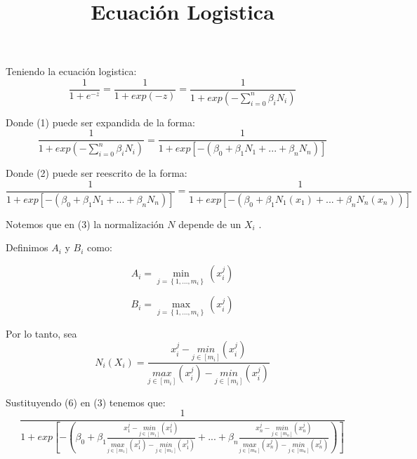 \documentclass{article}
\begin{document}
\title{Ecuación Logistica}
\maketitle
Teniendo la ecuación logistica:
\begin{equation}
    \label{simple_equation}
    \frac{1}{1+e^{-z}} = \frac{1}{1+exp\left ( -z\right )} = \frac{1}{1+exp\left (-\sum_{i=0}^{n} \beta _{i}N_{i} \right )}
\end{equation}

Donde (1) puede ser expandida de la forma:
\begin{equation}
    \label{simple_equation}
    \frac{1}{1+exp\left (-\sum_{i=0}^{n} \beta _{i}N_{i} \right )} = \frac{1}{1+exp\left [ -\left ( \beta _{0} + \beta _{1}N_{1}+...+\beta_{n}N_{n} \right ) \right ]}
\end{equation}

Donde (2) puede ser reescrito de la forma:
\begin{equation}
    \label{simple_equiation}    
    \frac{1}{1+exp\left [ -\left ( \beta _{0} + \beta _{1}N_{1}+...+\beta_{n}N_{n} \right ) \right ]} = \frac{1}{1+exp\left [ -\left ( \beta _{0} + \beta _{1}N_{1}(x_{1})+...+\beta_{n}N_{n} (x_{n})\right ) \right ]}
\end{equation}

Notemos que en (3) la normalización $N$ depende de un $X_{i}$ .

Definimos $A_{i}$ y $B_{i}$ como:

\begin{equation}
    \label{simple_equiation}
    A_{i}= \min_{j=\left \{ 1,...,m_{i} \right \}}\left ( x_{i}^{j} \right )
\end{equation}

\begin{equation}
    \label{simple_equiation}
    B_{i}= \max_{j=\left \{ 1,...,m_{i} \right \}}\left ( x_{i}^{j} \right )
\end{equation}

Por lo tanto, sea 
\begin{equation} N_{i} \left ( X_{i} \right )= \frac{x_{i}^{j} - \underset{j\in [m_{i} ]}{min}\left (  x_{i}^{j}\right )}{\underset{j\in [m_{i} ]}{max}\left (  x_{i}^{j}\right )-\underset{j\in [m_{i} ]}{min}\left (  x_{i}^{j}\right )}
\end{equation}

Sustituyendo (6) en (3) tenemos que: 
\begin{equation}
    \frac{1}{1+exp\left [ -\left ( \beta _{0} + \beta _{1}\frac{x_{1}^{j} - \underset{j\in [m_{1} ]}{min}\left (  x_{1}^{j}\right )}{\underset{j\in [m_{1} ]}{max}\left (  x_{1}^{j}\right )-\underset{j\in [m_{1} ]}{min}\left (  x_{1}^{j}\right )}+...+\beta_{n}\frac{x_{n}^{j} - \underset{j\in [m_{n} ]}{min}\left (  x_{n}^{j}\right )}{\underset{j\in [m_{n} ]}{max}\left (  x_{n}^{j}\right )-\underset{j\in [m_{n} ]}{min}\left (  x_{n}^{j}\right )}\right ) \right ]}
\end{equation}
\end{document}
